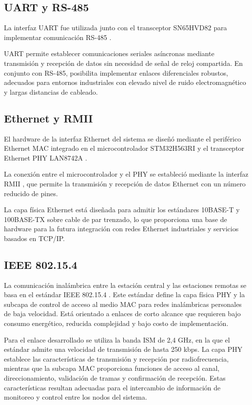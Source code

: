 \subsection{UART y RS-485}

La interfaz UART fue utilizada junto con el transceptor SN65HVD82 \cite{sn65hvd82} para implementar comunicación RS-485 \cite{rs485}.

UART permite establecer comunicaciones seriales asíncronas mediante transmisión y recepción de datos sin necesidad de señal de reloj compartida. En conjunto con RS-485, posibilita implementar enlaces diferenciales robustos, adecuados para entornos industriales con elevado nivel de ruido electromagnético y largas distancias de cableado.

\subsection{Ethernet y RMII}

El hardware de la interfaz Ethernet del sistema se diseñó mediante el periférico Ethernet MAC integrado en el microcontrolador STM32H563RI \cite{STM32H563_RefManual} y el transceptor Ethernet PHY LAN8742A \cite{lan8742a}.

La conexión entre el microcontrolador y el PHY se estableció mediante la interfaz RMII \cite{rmii}, que permite la transmisión y recepción de datos Ethernet con un número reducido de pines.

La capa física Ethernet está diseñada para admitir los estándares 10BASE-T y 100BASE-TX sobre cable de par trenzado, lo que proporciona una base de hardware para la futura integración con redes Ethernet industriales y servicios basados en TCP/IP.


\subsection{IEEE 802.15.4}

La comunicación inalámbrica entre la estación central y las estaciones remotas se basa en el estándar IEEE 802.15.4 \cite{ieee_standard}. Este estándar define la capa física PHY y la subcapa de control de acceso al medio MAC para redes inalámbricas personales de baja velocidad. Está orientado a enlaces de corto alcance que requieren bajo consumo energético, reducida complejidad y bajo costo de implementación.

Para el enlace desarrollado se utiliza la banda ISM de 2,4 GHz, en la que el estándar admite una velocidad de transmisión de hasta 250 kbps. La capa PHY establece las características de transmisión y recepción por radiofrecuencia, mientras que la subcapa MAC proporciona funciones de acceso al canal, direccionamiento, validación de tramas y confirmación de recepción. Estas características resultan adecuadas para el intercambio de información de monitoreo y control entre los nodos del sistema.



